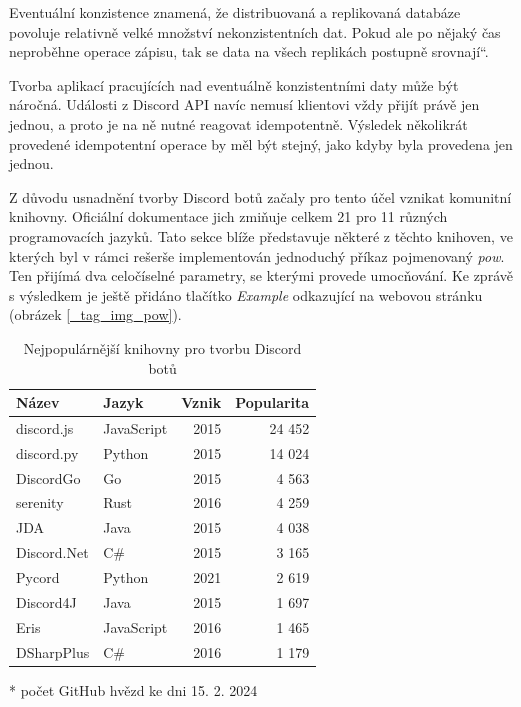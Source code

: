 \documentclass[FM]{tulthesis}
\begin{document}
	Eventuální konzistence znamená, že distribuovaná a replikovaná databáze povoluje relativně velké množství nekonzistentních dat. Pokud ale po nějaký čas neproběhne operace zápisu, tak se data na všech replikách postupně \quotedblbase srovnají\textquotedblleft. \cite{book_distributedSystems4}
	
	Tvorba aplikací pracujících nad eventuálně konzistentními daty může být náročná. Události z Discord API navíc nemusí klientovi vždy přijít právě jen jednou, a proto je na ně nutné reagovat idempotentně. Výsledek několikrát provedené idempotentní operace by měl být stejný, jako kdyby byla provedena jen jednou. \cite{book_distributedSystemsUnderstanding}
	
	Z důvodu usnadnění tvorby Discord botů začaly pro tento účel vznikat komunitní knihovny. Oficiální dokumentace jich zmiňuje celkem 21 pro 11 různých programovacích jazyků. Tato sekce blíže představuje některé z těchto knihoven, ve kterých byl v rámci rešerše implementován jednoduchý příkaz pojmenovaný \textit{pow}. Ten přijímá dva celočíselné parametry, se kterými provede umocňování. Ke zprávě s výsledkem je ještě přidáno tlačítko \textit{Example} odkazující na webovou stránku (obrázek \ref{_tag_img_pow}).
	
	\begin{table}[ht]
		\centering
		\caption{Nejpopulárnější knihovny pro tvorbu Discord botů}\medskip
		\begin{threeparttable}
			\begin{tabular}{ l l r r }
				\textbf{Název} & \textbf{Jazyk} & \textbf{Vznik} & \textbf{Popularita}\tnote{*} \\\hline
				discord.js	& JavaScript 	& 2015 & 24 452 \\
				discord.py	& Python		& 2015 & 14 024 \\
				DiscordGo	& Go			& 2015 & 4 563 \\
				serenity	& Rust			& 2016 & 4 259 \\
				JDA			& Java			& 2015 & 4 038 \\
				Discord.Net & C\#			& 2015 & 3 165 \\
				Pycord		& Python		& 2021 & 2 619 \\
				Discord4J	& Java			& 2015 & 1 697 \\
				Eris		& JavaScript	& 2016 & 1 465 \\
				DSharpPlus	& C\#			& 2016 & 1 179 \\
			\hline\end{tabular}
			\begin{tablenotes}
				\item[*] počet GitHub hvězd ke dni 15. 2. 2024
			\end{tablenotes}
		\end{threeparttable}
	\end{table}
	
\end{document}
